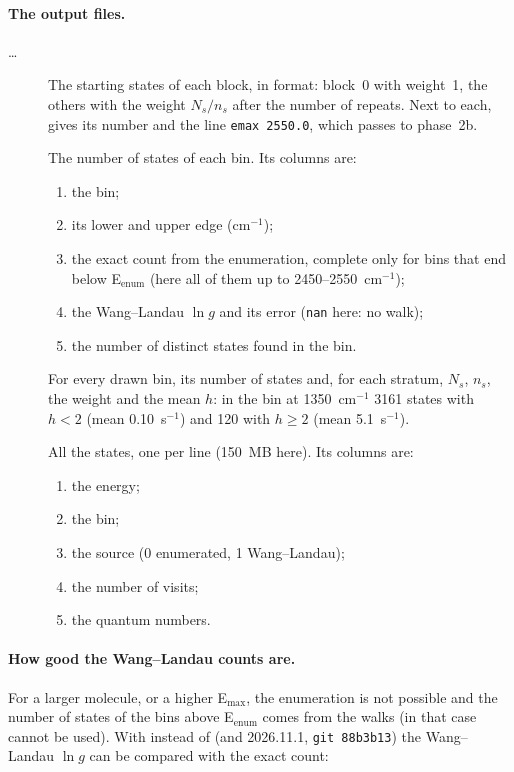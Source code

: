 \paragraph{The output files.}
\begin{description}
\item[ \ldots\ ] The
starting states of each block, in  format: block~0 with
weight~1, the others with the weight $N_s/n_s$ after the number of
repeats. Next to each,  gives its number and the line
\texttt{emax 2550.0}, which  passes to phase~2b.
\item[] The number of states of each bin. Its columns are:
\begin{enumerate}
\item the bin;
\item its lower and upper edge (cm$^{-1}$);
\item the exact count from the enumeration, complete only for bins that
end below E$_\mathrm{enum}$ (here all of them up to 2450--2550~cm$^{-1}$);
\item the Wang--Landau $\ln g$ and its error (\texttt{nan} here: no walk);
\item the number of distinct states found in the bin.
\end{enumerate}
\item[] For every drawn bin, its number of states
and, for each stratum, $N_s$, $n_s$, the weight and the mean $h$: in the
bin at 1350~cm$^{-1}$ 3161 states with $h<2$ (mean 0.10~s$^{-1}$) and 120
with $h\ge2$ (mean 5.1~s$^{-1}$).
\item[] All the states, one per line (150~MB here).
Its columns are:
\begin{enumerate}
\item the energy;
\item the bin;
\item the source (0 enumerated, 1 Wang--Landau);
\item the number of visits;
\item the quantum numbers.
\end{enumerate}
\end{description}

\paragraph{How good the Wang--Landau counts are.} For a larger molecule,
or a higher E$_\mathrm{max}$, the enumeration is not possible and the
number of states of the bins above E$_\mathrm{enum}$ comes from the walks
(in that case  cannot be used). With  instead of  (and 2026.11.1,
\texttt{git 88b3b13}) the Wang--Landau $\ln g$ can be compared with the
exact count:

